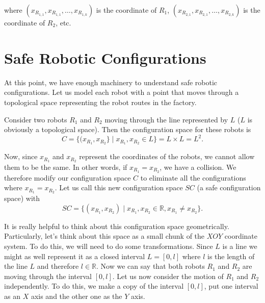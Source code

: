 \documentclass[12pt]{article}
\newcommand{\reals}{\mathbb{R}}                           %
\theoremstyle{definition}
\begin{document}
where $(x_{R_{1, 1}}, x_{R_{1, 1}}, \dots, x_{R_{1, k}})$ is the coordinate of $R_1$, $(x_{R_{2, 1}}, x_{R_{2, 1}}, \dots, x_{R_{2, k}})$ is the coordinate of $R_2$, etc.


\section*{\centering Safe Robotic Configurations}

At this point, we have enough machinery to understand safe robotic configurations.
Let us model each robot with a point that moves through a topological space representing
the robot routes in the factory.

\bigskip

Consider two robots $R_1$ and $R_2$ moving through the line represented by $L$ ($L$ is obviously a topological space).
Then the configuration space for these robots is
$$C = \{(x_{R_1}, x_{R_2}\} \mid x_{R_1}, x_{R_2} \in L\} = L \times L = L^2.$$

\bigskip

Now, since $x_{R_1}$ and $x_{R_2}$ represent the coordinates of the robots, we cannot allow them to be the same.
In other words, if $x_{R_1} = x_{R_2}$, we have a collision. We therefore modify our configuration space $C$
to eliminate all the configurations where $x_{R_1} = x_{R_2}$. Let us call this new configuration space $SC$
(a safe configuration space) with
$$SC = \{(x_{R_1}, x_{R_2}) \mid x_{R_1}, x_{R_2} \in \reals, x_{R_1} \neq x_{R_2}\}.$$

\bigskip

It is really helpful to think about this configuration space geometrically.
Particularly, let's think about this space as a small chunk of the $XOY$ coordinate system.
To do this, we will need to do some transformations. Since $L$ is a line we might as well
represent it as a closed interval $L = [0, l]$ where $l$ is the length of the line $L$ and therefore
$l \in \reals$. Now we can say that both robots $R_1$ and $R_2$ are moving through the interval $[0, l]$.
Let us now consider the motion of $R_1$ and $R_2$ independently. To do this, we make a copy
of the interval $[0, l]$, put one interval as an $X$ axis and the other one as the $Y$ axis.
\end{document}
